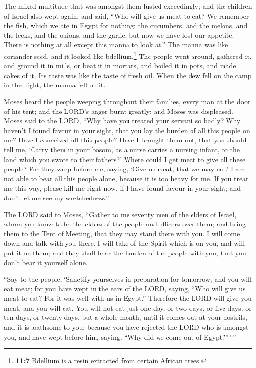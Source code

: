  The mixed multitude that was amongst them lusted
exceedingly; and the children of Israel also wept again, and said, ``Who
will give us meat to eat?  We remember the fish, which we
ate in Egypt for nothing; the cucumbers, and the melons, and the leeks,
and the onions, and the garlic;  but now we have lost our
appetite. There is nothing at all except this manna to look at.''
 The manna was like coriander seed, and it looked like
bdellium.\footnote{\textbf{11:7} Bdellium is a resin extracted from
  certain African trees.}  The people went around,
gathered it, and ground it in mills, or beat it in mortars, and boiled
it in pots, and made cakes of it. Its taste was like the taste of fresh
oil.  When the dew fell on the camp in the night, the
manna fell on it.

 Moses heard the people weeping throughout their
families, every man at the door of his tent; and the LORD's anger burnt
greatly; and Moses was displeased.  Moses said to the
LORD, ``Why have you treated your servant so badly? Why haven't I found
favour in your sight, that you lay the burden of all this people on me?
 Have I conceived all this people? Have I brought them
out, that you should tell me, `Carry them in your bosom, as a nurse
carries a nursing infant, to the land which you swore to their fathers?'
 Where could I get meat to give all these people? For
they weep before me, saying, `Give us meat, that we may eat.'
 I am not able to bear all this people alone, because it
is too heavy for me.  If you treat me this way, please
kill me right now, if I have found favour in your sight; and don't let
me see my wretchedness.''

 The LORD said to Moses, ``Gather to me seventy men of
the elders of Israel, whom you know to be the elders of the people and
officers over them; and bring them to the Tent of Meeting, that they may
stand there with you.  I will come down and talk with you
there. I will take of the Spirit which is on you, and will put it on
them; and they shall bear the burden of the people with you, that you
don't bear it yourself alone.

 ``Say to the people, `Sanctify yourselves in preparation
for tomorrow, and you will eat meat; for you have wept in the ears of
the LORD, saying, ``Who will give us meat to eat? For it was well with
us in Egypt.'' Therefore the LORD will give you meat, and you will eat.
 You will not eat just one day, or two days, or five
days, or ten days, or twenty days,  but a whole month,
until it comes out at your nostrils, and it is loathsome to you; because
you have rejected the LORD who is amongst you, and have wept before him,
saying, ``Why did we come out of Egypt?''\,'\,''

